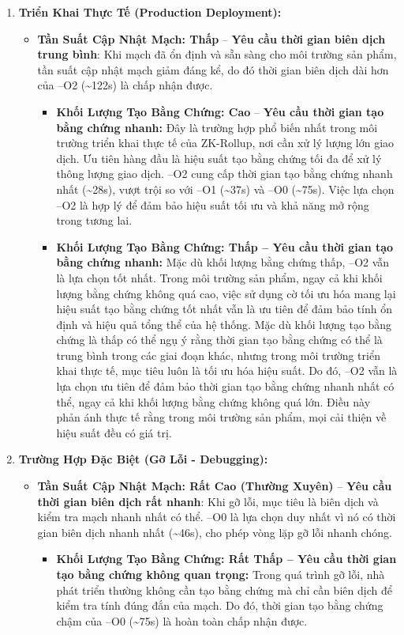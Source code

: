 \begin{enumerate}
    \item \textbf{Triển Khai Thực Tế (Production Deployment):}
    \begin{itemize}
        \item \textbf{Tần Suất Cập Nhật Mạch: Thấp} -- \textbf{Yêu cầu thời gian biên dịch trung bình}: Khi mạch đã ổn định và sẵn sàng cho môi trường sản phẩm, tần suất cập nhật mạch giảm đáng kể, do đó thời gian biên dịch dài hơn của --O2 (\textasciitilde 122s) là chấp nhận được.
        \begin{itemize}
            \item \textbf{Khối Lượng Tạo Bằng Chứng: Cao} -- \textbf{Yêu cầu thời gian tạo bằng chứng nhanh:} Đây là trường hợp phổ biến nhất trong môi trường triển khai thực tế của ZK-Rollup, nơi cần xử lý lượng lớn giao dịch. Ưu tiên hàng đầu là hiệu suất tạo bằng chứng tối đa để xử lý thông lượng giao dịch. --O2 cung cấp thời gian tạo bằng chứng nhanh nhất (\textasciitilde 28s), vượt trội so với --O1 (\textasciitilde 37s) và --O0 (\textasciitilde 75s). Việc lựa chọn --O2 là hợp lý để đảm bảo hiệu suất tối ưu và khả năng mở rộng trong tương lai.
            \item \textbf{Khối Lượng Tạo Bằng Chứng: Thấp -- Yêu cầu thời gian tạo bằng chứng \textbf{nhanh}:} Mặc dù khối lượng bằng chứng thấp, --O2 vẫn là lựa chọn tốt nhất. Trong môi trường sản phẩm, ngay cả khi khối lượng bằng chứng không quá cao, việc sử dụng cờ tối ưu hóa mang lại hiệu suất tạo bằng chứng tốt nhất vẫn là ưu tiên để đảm bảo tính ổn định và hiệu quả tổng thể của hệ thống. Mặc dù khối lượng tạo bằng chứng là thấp có thể ngụ ý rằng thời gian tạo bằng chứng có thể là trung bình trong các giai đoạn khác, nhưng trong môi trường triển khai thực tế, mục tiêu luôn là tối ưu hóa hiệu suất. Do đó, --O2 vẫn là lựa chọn ưu tiên để đảm bảo thời gian tạo bằng chứng nhanh nhất có thể, ngay cả khi khối lượng bằng chứng không quá lớn. Điều này phản ánh thực tế rằng trong môi trường sản phẩm, mọi cải thiện về hiệu suất đều có giá trị.
        \end{itemize}
    \end{itemize}

    \item \textbf{Trường Hợp Đặc Biệt (Gỡ Lỗi - Debugging):}
    \begin{itemize}
        \item \textbf{Tần Suất Cập Nhật Mạch: Rất Cao (Thường Xuyên)} -- \textbf{Yêu cầu thời gian biên dịch rất nhanh}: Khi gỡ lỗi, mục tiêu là biên dịch và kiểm tra mạch nhanh nhất có thể. --O0 là lựa chọn duy nhất vì nó có thời gian biên dịch nhanh nhất (\textasciitilde 46s), cho phép vòng lặp gỡ lỗi nhanh chóng.
        \begin{itemize}
            \item \textbf{Khối Lượng Tạo Bằng Chứng: Rất Thấp -- Yêu cầu thời gian tạo bằng chứng \textbf{không quan trọng}:} Trong quá trình gỡ lỗi, nhà phát triển thường không cần tạo bằng chứng mà chỉ cần biên dịch để kiểm tra tính đúng đắn của mạch. Do đó, thời gian tạo bằng chứng chậm của --O0 (\textasciitilde 75s) là hoàn toàn chấp nhận được.
            

\end{itemize}
\end{itemize}
\end{enumerate}
